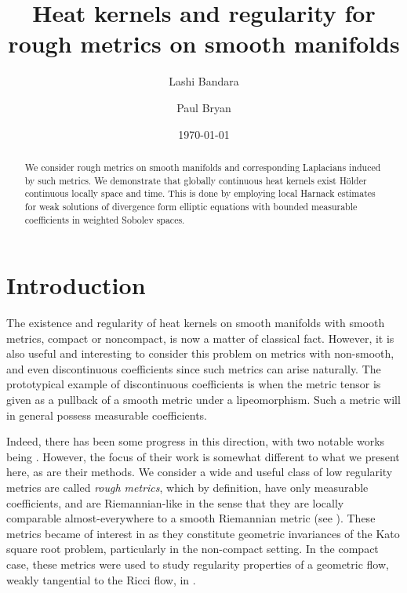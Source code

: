 \documentclass[a4paper, 12pt]{amsart}
\begin{document}
\title[Heat kernels and regularity for rough metrics]{Heat kernels and regularity for rough metrics on smooth manifolds}

\author{Lashi Bandara}
\author{Paul Bryan}

\curraddr{}
\email{}
\date{\today}

\dedicatory{}
\subjclass[2010]{}
\keywords{}

\maketitle

\begin{abstract}
We consider rough metrics on smooth manifolds and corresponding Laplacians induced by such metrics.
We demonstrate  that globally continuous heat kernels exist Hölder continuous locally space and time. 
This is done by employing local Harnack estimates for weak
solutions of divergence form elliptic equations
with bounded measurable coefficients in weighted Sobolev spaces.
\end{abstract}

\setcounter{tocdepth}{1}
\tableofcontents

\parindent0cm
\setlength{\parskip}{\baselineskip}



\section{Introduction}
\label{sec:intro}
The existence and regularity of heat kernels on smooth manifolds with smooth metrics, compact or noncompact, 
is now a matter of classical fact. 
However, it is also useful and interesting to consider this problem on
metrics with non-smooth, and even discontinuous coefficients since such 
metrics can arise naturally.  The prototypical example of discontinuous coefficients
is when the metric tensor is given as a pullback of a smooth metric under a 
lipeomorphism. Such a metric will in general possess measurable
coefficients.

Indeed, there has been some progress in this direction,
with two notable works being \cite{Norris, ERS}.
However, the focus of their work is somewhat different to 
what we present here, as are their methods.
We consider a wide and useful class of 
low regularity metrics are called \emph{rough metrics}, 
which by definition, have only measurable coefficients, and are Riemannian-like in the sense
that they are locally comparable almost-everywhere to a smooth Riemannian metric (see ).
These metrics became of interest in \cite{BMc, BRough} as they constitute geometric invariances of the Kato square
root problem, particularly in the non-compact setting. 
In the compact case, these metrics were used to study regularity properties
of a geometric flow, weakly tangential to the Ricci flow, 
in \cite{BLM, BCont}.
\end{document}

